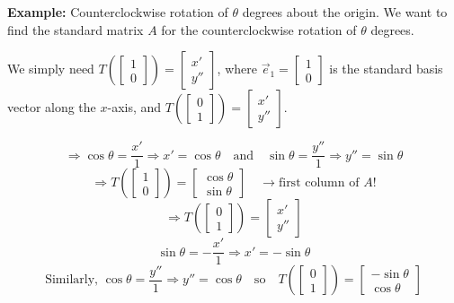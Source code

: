 \documentclass{article}
\begin{document}
\textbf{Example:} Counterclockwise rotation of $\theta$ degrees about the origin. We want to find the standard matrix $A$ for the counterclockwise rotation of $\theta$ degrees.

We simply need $T\left(\begin{bmatrix} 1 \\ 0 \end{bmatrix}\right) = \begin{bmatrix} x' \\ y'' \end{bmatrix}$, where $\vec{e}_1 = \begin{bmatrix} 1 \\ 0 \end{bmatrix}$ is the standard basis vector along the $x$-axis, and $T\left(\begin{bmatrix} 0 \\ 1 \end{bmatrix}\right) = \begin{bmatrix} x' \\ y'' \end{bmatrix}$.

\[
\Rightarrow \cos \theta = \frac{x'}{1} \Rightarrow x' = \cos \theta \quad \text{and} \quad \sin \theta = \frac{y''}{1} \Rightarrow y'' = \sin \theta
\]
\[
\Rightarrow T\left(\begin{bmatrix} 1 \\ 0 \end{bmatrix}\right) = \begin{bmatrix} \cos \theta \\ \sin \theta \end{bmatrix} \quad \rightarrow \text{first column of } A!
\]
\[
\Rightarrow T\left(\begin{bmatrix} 0 \\ 1 \end{bmatrix}\right) = \begin{bmatrix} x' \\ y'' \end{bmatrix}
\]
\[
\sin \theta = -\frac{x'}{1} \Rightarrow x' = -\sin \theta
\]
\[
\text{Similarly, } \cos \theta = \frac{y''}{1} \Rightarrow y'' = \cos \theta \quad \text{so} \quad T\left(\begin{bmatrix} 0 \\ 1 \end{bmatrix}\right) = \begin{bmatrix} -\sin \theta \\ \cos \theta \end{bmatrix}
\]
\end{document}

